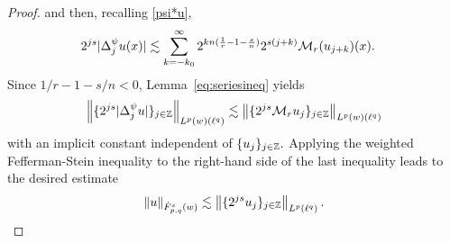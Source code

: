 {\begin{proof}
and then, recalling \eqref{psi*u}, 
\begin{align*}
2^{js} |\Delta^\psi_j  u(x)| & \lesssim  \sum_{k =  - k_0}^\infty 2^{k n (\frac{1}{r} -1-\frac{s}{n})} 2^{s(j+k)}\M_r(u_{j+k})(x).
\end{align*}
Since $1/r -1-s/n < 0$,   Lemma~\ref{eq:seriesineq}  yields
$$
\norm{\{ 2^{js} |\Delta^\psi_j  u|\}_{j\in\ent}}{L^p(w)(\ell^{q})} \lesssim \norm{\{2^{js} \M_ru_j\}_{j\in\ent}}{L^p(w)(\ell^{q})}
$$
with an implicit constant independent of $\{u_j\}_{j\in \ent}.$
Applying the weighted  Fefferman-Stein inequality  to the right-hand side of the last inequality leads to the desired estimate
\begin{equation*}
\norm{u}{\tlw{p}{s}{q}{w}} \lesssim \norm{\{2^{js}u_j\}_{j\in\ent}}{L^p(\ell^{q})}.
\end{equation*}


\end{proof}}
